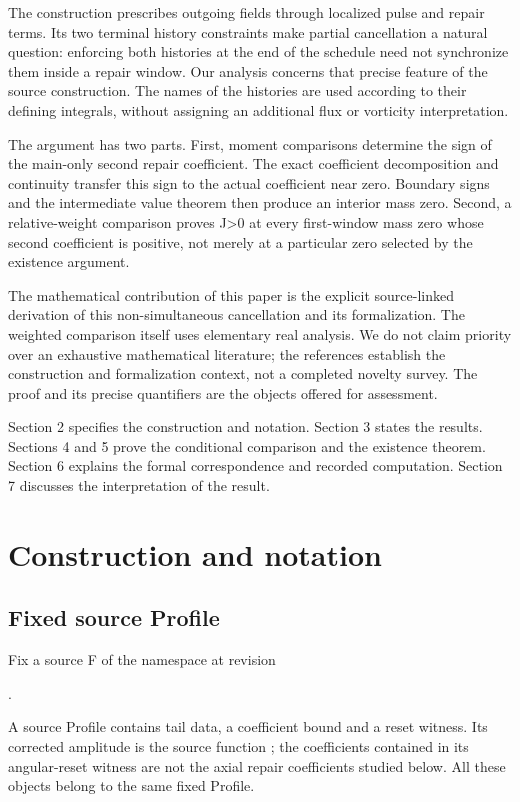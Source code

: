 \documentclass[11pt,a4paper]{article}
\begin{document}
The construction prescribes outgoing fields through localized pulse and repair terms. Its two terminal history constraints make partial cancellation a natural question: enforcing both histories at the end of the schedule need not synchronize them inside a repair window. Our analysis concerns that precise feature of the source construction. The names of the histories are used according to their defining integrals, without assigning an additional flux or vorticity interpretation.

The argument has two parts. First, moment comparisons determine the sign of the main-only second repair coefficient. The exact coefficient decomposition and continuity transfer this sign to the actual coefficient near zero. Boundary signs and the intermediate value theorem then produce an interior mass zero. Second, a relative-weight comparison proves J>0 at every first-window mass zero whose second coefficient is positive, not merely at a particular zero selected by the existence argument.

The mathematical contribution of this paper is the explicit source-linked derivation of this non-simultaneous cancellation and its formalization. The weighted comparison itself uses elementary real analysis. We do not claim priority over an exhaustive mathematical literature; the references establish the construction and formalization context, not a completed novelty survey. The proof and its precise quantifiers are the objects offered for assessment.

Section 2 specifies the construction and notation. Section 3 states the results. Sections 4 and 5 prove the conditional comparison and the existence theorem. Section 6 explains the formal correspondence and recorded computation. Section 7 discusses the interpretation of the result.

\section{Construction and notation}

\subsection{Fixed source Profile}

Fix a source  F of the  namespace at revision

.

A source Profile contains tail data, a coefficient bound and a reset witness. Its corrected amplitude is the source function ; the coefficients contained in its angular-reset witness are not the axial repair coefficients studied below. All these objects belong to the same fixed Profile.
\end{document}

